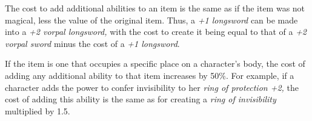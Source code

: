 The cost to add additional abilities to an item is the same as if the item was not magical, less the value of the original item. Thus, a \textit{+1 longsword} can be made into a \textit{+2 vorpal longsword,} with the cost to create it being equal to that of a \textit{+2 vorpal sword} minus the cost of a \textit{+1 longsword}.
				
If the item is one that occupies a specific place on a character's body, the cost of adding any additional ability to that item increases by 50\%. For example, if a character adds the power to confer invisibility to her \textit{ring of protection +2,} the cost of adding this ability is the same as for creating a \textit{ring of invisibility} multiplied by 1.5. 

